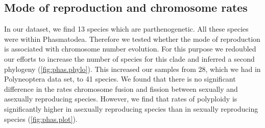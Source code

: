 \subsection{Mode of reproduction and chromosome rates}
In our dataset, we find 13 species which are parthenogenetic. 
All these species were within Phasmatodea.
Therefore we tested whether the mode of reproduction is associated with chromosome number evolution. 
For this purpose we redoubled our efforts to increase the number of species for this clade and inferred a second phylogeny (\cref{fig:phas.phylo}).
This increased our samples from 28, which we had in Polyneoptera data set, to 41 species. 
We found that there is no significant difference in the rates chromosome fusion and fission between sexually and asexually reproducing species.
However, we find that rates of polyploidy is significantly higher in asexually reproducing species than in sexually reproducing species (\cref{fig:phas.plot}).